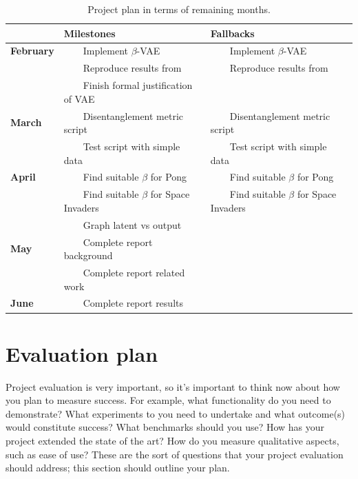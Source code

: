 \documentclass[12pt,twoside]{article}
\begin{document}
\newcommand{\tabitem}{~~\llap{\textbullet}~~}
\begin{table}[h!]
\centering
\caption{Project plan in terms of remaining months.}
\label{tab:project_plan}
\begin{tabular}{@{}lll@{}}
\toprule
                  & \textbf{Milestones}                 & \textbf{Fallbacks}             \\ \midrule
\textbf{February} & \tabitem Implement $\beta$-VAE      & \tabitem Implement $\beta$-VAE \\
                  & \tabitem Reproduce results from \cite{Higgins2016} & \tabitem Reproduce results from \cite{Higgins2016}\\
                  & \tabitem Finish formal justification of VAE &  \\
\textbf{March}    & \tabitem Disentanglement metric script & \tabitem Disentanglement metric script \\
                  & \tabitem Test script with simple data & \tabitem Test script with simple data   \\
\textbf{April}    & \tabitem Find suitable $\beta$ for Pong & \tabitem Find suitable $\beta$ for Pong \\
                  & \tabitem Find suitable $\beta$ for Space Invaders & \tabitem Find suitable $\beta$ for Space Invaders \\
                  & \tabitem Graph latent vs output &                    \\                  
\textbf{May}      & \tabitem Complete report background & \\
                  & \tabitem Complete report related work &                    \\                  
\textbf{June}     & \tabitem Complete report results      &                    \\ \bottomrule
\end{tabular}
\end{table}

\newpage
\section{Evaluation plan}
Project evaluation is very important, so it's important to think now about how you plan to measure success. For example, what functionality do you need to demonstrate?  What experiments to you need to undertake and what outcome(s) would constitute success?  What benchmarks should you use? How has your project extended the state of the art?  How do you measure qualitative aspects, such as ease of use?  These are the sort of questions that your project evaluation should address; this section should outline your plan.


\end{document}
